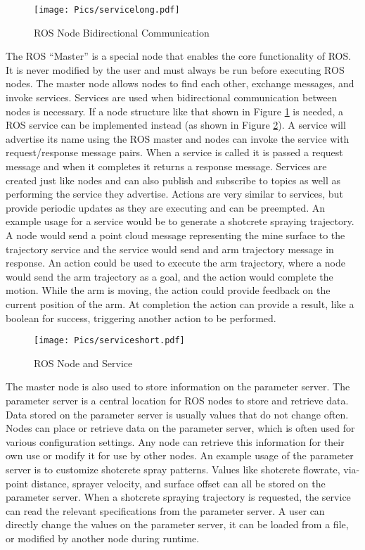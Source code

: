 \begin{figure}[h!]
    \centering
    \texttt{[image: Pics/servicelong.pdf]}
    \caption{ROS Node Bidirectional Communication}
    \label{fig:rosservicelong}
\end{figure}

The ROS ``Master'' is a special node that enables the core functionality of ROS. It is never modified by the user and must always be run before executing ROS nodes. The master node allows nodes to find each other, exchange messages, and invoke services. Services are used when bidirectional communication between nodes is necessary. If a node structure like that shown in Figure \ref{fig:rosservicelong} is needed, a ROS service can be implemented instead (as shown in Figure \ref{fig:rosservice}). A service will advertise its name using the ROS master and nodes can invoke the service with request/response message pairs. When a service is called it is passed a request message and when it completes it returns a response message. Services are created just like nodes and can also publish and subscribe to topics as well as performing the service they advertise. Actions are very similar to services, but provide periodic updates as they are executing and can be preempted. An example usage for a service would be to generate a shotcrete spraying trajectory. A node would send a point cloud message representing the mine surface to the trajectory service and the service would send and arm trajectory message in response. An action could be used to execute the arm trajectory, where a node would send the arm trajectory as a goal, and the action would complete the motion. While the arm is moving, the action could provide feedback on the current position of the arm. At completion the action can provide a result, like a boolean for success, triggering another action to be performed.\\

\begin{figure}[h!]
    \centering
    \texttt{[image: Pics/serviceshort.pdf]}
    \caption{ROS Node and Service}
    \label{fig:rosservice}
\end{figure}

The master node is also used to store information on the parameter server. The parameter server is a central location for ROS nodes to store and retrieve data. Data stored on the parameter server is usually values that do not change often. Nodes can place or retrieve data on the parameter server, which is often used for various configuration settings. Any node can retrieve this information for their own use or modify it for use by other nodes. An example usage of the parameter server is to customize shotcrete spray patterns. Values like shotcrete flowrate, via-point distance, sprayer velocity, and surface offset can all be stored on the parameter server. When a shotcrete spraying trajectory is requested, the service can read the relevant specifications from the parameter server. A user can directly change the values on the parameter server, it can be loaded from a file, or modified by another node during runtime.\\

